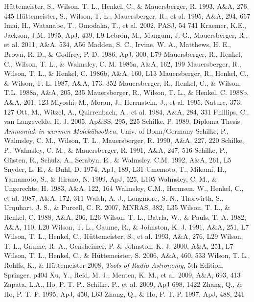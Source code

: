 \documentclass[oldversion]{aa}
\begin{document}
\begin{thebibliography}{}
  H{\"u}ttemeister, S., Wilson, T. L., Henkel, C., \& Mauersberger, R. 1993, 
  A\&A, 276, 445
  H{\"u}ttemeister, S., Wilson, T. L., Mauersberger, R., et al. 1995, A\&A,
  294, 667
  Imai, H., Watanabe, T., Omodaka, T., et al. 2002, PASJ, 54 741 
  Kraemer, K.E., Jackson, J.M. 1995, ApJ, 439, L9
  Lebr{\'o}n, M., Mangum, J. G., Mauersberger, R., et al. 2011, A\&A, 534, A56
  Madden, S. C., Irvine, W. A., Matthews, H. E., Brown, R. D., \& Godfrey, P. D.
  1986, ApJ, 300, L79
  Mauersberger, R., Henkel, C., Wilson, T. L., \& Walmsley, C. M. 1986a, A\&A, 162, 199
  Mauersberger, R., Wilson, T. L., \& Henkel, C. 1986b, A\&A, 160, L13
  Mauersberger, R., Henkel, C., \& Wilson, T. L. 1987, A\&A, 173, 352
  Mauersberger, R., Henkel, C., \& Wilson, T.L. 1988a, A\&A, 205, 235
  Mauersberger, R., Wilson, T. L., \& Henkel, C. 1988b, A\&A, 201, 123
  Miyoshi, M., Moran, J., Herrnstein, J., et al. 1995, Nature, 373, 127
  Ott, M., Witzel, A., Quirrenbach, A., et al. 1984, A\&A, 284, 331
  Phillips, C., van Langevelde, H. J. 2005, Ap\&SS, 295, 225
  Schilke, P. 1989, Diploma Thesis, {\it Ammoniak in warmen Molek{\"u}lwolken},
  Univ. of Bonn/Germany
  Schilke, P., Walmsley, C. M., Wilson, T. L., Mauersberger, R. 1990, A\&A,
  227, 220
  Schilke, P., Walmsley, C. M., \& Mauersberger, R. 1991, A\&A, 247, 516
  Schilke, P., G{\"u}sten, R., Schulz, A., Serabyn, E., \& Walmsley, C.M.
  1992, A\&A, 261, L5
  Snyder, L. E., \& Buhl, D. 1974, ApJ, 189, L31
  Umemoto, T., Mikami, H., Yamamoto, S., \& Hirano, N. 1999, ApJ, 525, L105
  Walmsley, C. M., \& Ungerechts, H. 1983, A\&A, 122, 164
  Walmsley, C.M., Hermsen, W., Henkel, C., et al. 1987, A\&A, 172, 311
  Walsh, A. J., Longmore, S. N., Thorwirth, S., Urquhart, J. S., \& 
  Purcell, C. R. 2007, MNRAS, 382, L35
  Wilson, T. L., \& Henkel, C. 1988, A\&A, 206, L26
  Wilson, T. L., Batrla, W., \& Pauls, T. A. 1982, A\&A, 110, L20
  Wilson, T. L., Gaume, R., \& Johnston, K. J. 1991, A\&A, 251, L7
  Wilson, T. L., Henkel, C., H{\"u}ttemeister, S., et al. 1993, A\&A, 276, L29
  Wilson, T. L., Gaume, R. A., Gensheimer, P. \& Johnston, K. J. 2000, A\&A, 251, L7
  Wilson, T. L., Henkel, C., \& H{\"u}ttemeister, S. 2006, A\&A, 460, 533
  Wilson, T. L., Rohlfs, K., \& H{\"u}ttemeister 2008, {\it Tools of Radio 
  Astronomy}, 5th Edition, Springer, p404  
  Xu, Y., Reid, M. J., Menten, K. M., et al. 2009, A\&A, 693, 413
  Zapata, L.A., Ho, P. T. P., Schilke, P., et al. 2009, ApJ 698, 1422
  Zhang, Q., \& Ho, P. T. P. 1995, ApJ, 450, L63
  Zhang, Q., \& Ho, P. T. P. 1997, ApJ, 488, 241

\end{thebibliography}
\end{document}
